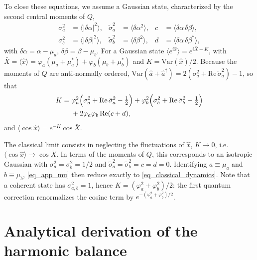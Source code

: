 \documentclass[aps,prx,reprint,floatfix,amsmath,amssymb,longbibliography]{revtex4-2}
\newcommand{\da}{^\dagger}
\newcommand{\ha}{\hat{a}}
\begin{document}
To close these equations, we assume a Gaussian state, characterized by the second central moments of $Q$,
\begin{equation}
\begin{aligned}
    \sigma_a^2&=\langle|\delta\alpha|^2\rangle, & \tilde\sigma_a^2&=\langle\delta\alpha^2\rangle, & c&=\langle\delta\alpha\,\delta\beta\rangle,\\
    \sigma_b^2&=\langle|\delta\beta|^2\rangle, & \tilde\sigma_b^2&=\langle\delta\beta^2\rangle, & d&=\langle\delta\alpha\,\delta\beta^*\rangle,
\end{aligned}
\end{equation}
with $\delta\alpha=\alpha-\mu_a$, $\delta\beta=\beta-\mu_b$. For a Gaussian state $\langle e^{i\hat x}\rangle=e^{i\bar X-K}$, with $\bar X=\langle\hat x\rangle=\varphi_a(\mu_a+\mu_a^*)+\varphi_b(\mu_b+\mu_b^*)$ and $K=\mathrm{Var}(\hat x)/2$. Because the moments of $Q$ are anti-normally ordered, $\mathrm{Var}(\ha+\ha\da)=2(\sigma_a^2+\mathrm{Re}\,\tilde\sigma_a^2)-1$, so that
\begin{equation}
\begin{split}
    K =\;& \varphi_a^2\Bigl(\sigma_a^2+\mathrm{Re}\,\tilde\sigma_a^2-\tfrac12\Bigr)
         +\varphi_b^2\Bigl(\sigma_b^2+\mathrm{Re}\,\tilde\sigma_b^2-\tfrac12\Bigr)\\
         &+2\varphi_a\varphi_b\,\mathrm{Re}(c+d),
\end{split}
\end{equation}
and $\langle\cos\hat x\rangle=e^{-K}\cos\bar X$.

The classical limit consists in neglecting the fluctuations of $\hat x$, $K\to0$, i.e.\ $\langle\cos\hat x\rangle\to\cos\bar X$. In terms of the moments of $Q$, this corresponds to an isotropic Gaussian with $\sigma_a^2=\sigma_b^2=1/2$ and $\tilde\sigma_a^2=\tilde\sigma_b^2=c=d=0$. Identifying $a\equiv\mu_a$ and $b\equiv\mu_b$, \cref{eq_app_mu} then reduce exactly to \cref{eq_classical_dynamics}. Note that a coherent state has $\sigma_{a,b}^2=1$, hence $K=(\varphi_a^2+\varphi_b^2)/2$: the first quantum correction renormalizes the cosine term by $e^{-(\varphi_a^2+\varphi_b^2)/2}$.

\section{Analytical derivation of the harmonic balance}
\label{app:derivation_harmonic_balance}
\end{document}
